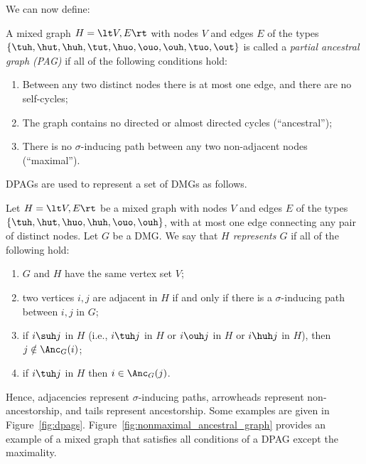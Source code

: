 We can now define:
\begin{Def}\label{def:dpag}
  A mixed graph $H = \lt V,E\rt$ with nodes $V$ and edges $E$ of the types $\{\tuh,\hut,\huh,\tut,\huo,\ouo,\ouh,\tuo,\out\}$ is called a \emph{partial ancestral graph (PAG)} if all of the following conditions hold:
  \begin{enumerate}
    \item Between any two distinct nodes there is at most one edge, and there are no self-cycles;
    \item The graph contains no directed or almost directed cycles (``ancestral'');
    \item There is no $\sigma$-inducing path between any two non-adjacent nodes (``maximal'').
  \end{enumerate}
\end{Def}
DPAGs are used to represent a set of DMGs as follows.
\begin{Def}\label{def:dpag_represents_dmg}
  Let $H = \lt V,E\rt$ be a mixed graph with nodes $V$ and edges $E$ of the types $\{\tuh,\hut,\huo,\huh,\ouo,\ouh\}$, with at most one edge connecting any pair of distinct nodes.
  Let $G$ be a DMG.
  We say that \emph{$H$ represents $G$} if all of the following hold:
  \begin{enumerate}
    \item $G$ and $H$ have the same vertex set $V$;
    \item two vertices $i,j$ are adjacent in $H$ if and only if there is a $\sigma$-inducing path between $i,j$ in $G$;
    \item if $i \suh j$ in $H$ (i.e., $i \tuh j$ in $H$ or $i \ouh j$ in $H$ or $i \huh j$ in $H$), then $j \notin \Anc_{G}(i)$; 
    \item if $i \tuh j$ in $H$ then $i \in \Anc_{G}(j)$. 
  \end{enumerate}
\end{Def}
Hence, adjacencies represent $\sigma$-inducing paths, arrowheads represent non-ancestorship, and tails represent ancestorship.
Some examples are given in Figure~\ref{fig:dpags}. 
Figure~\ref{fig:nonmaximal_ancestral_graph} provides an example of a mixed graph that satisfies all conditions of a DPAG except the maximality.

